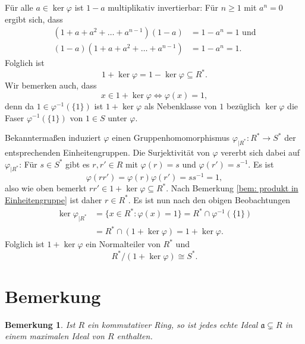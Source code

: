 \documentclass[a4paper,10pt]{article}
\newcounter{satze}
\newtheorem{bem}[satze]{Bemerkung}
\newcommand{\mf}[1]{\mathfrak{#1}}
\begin{document}
Für alle $a \in \ker \varphi$ ist $1-a$ multiplikativ invertierbar: Für $n \geq 1$ mit $a^n = 0$ ergibt sich, dass
\begin{align*}
 (1+a+a^2+\ldots+a^{n-1})(1-a) &= 1-a^n = 1 \text{ und} \\
 (1-a)(1+a+a^2+\ldots+a^{n-1}) &= 1-a^n = 1.
\end{align*}
Folglich ist
\[
 1 + \ker \varphi = 1 - \ker \varphi \subseteq R^*.
\]
Wir bemerken auch, dass
\[
 x \in 1 + \ker \varphi \Leftrightarrow \varphi(x) = 1,
\]
denn da $1 \in \varphi^{-1}(\{1\})$ ist $1 + \ker \varphi$ als Nebenklasse von $1$ bezüglich $\ker \varphi$ die Faser $\varphi^{-1}(\{1\})$ von $1 \in S$ unter $\varphi$.

Bekanntermaßen induziert $\varphi$ einen Gruppenhomomorphismus $\varphi_{|R^*} : R^* \rightarrow S^*$ der entsprechenden Einheitengruppen. Die Surjektivität von $\varphi$ vererbt sich dabei auf $\varphi_{|R^*}$: Für $s\in S^*$ gibt es $r,r' \in R$ mit $\varphi(r) = s$ und $\varphi(r') = s^{-1}$. Es ist
\[
 \varphi(r r') = \varphi(r) \varphi(r') = s s^{-1} = 1,
\]
also wie oben bemerkt $r r' \in 1 + \ker \varphi \subseteq R^*$. Nach Bemerkung \ref{bem: produkt in Einheitengruppe} ist daher $r \in R^*$. Es ist nun nach den obigen Beobachtungen
\begin{align*}
 \ker \varphi_{|R^*}
 &= \{x \in R^* : \varphi(x) = 1\}
 = R^* \cap \varphi^{-1}(\{1\}) \\
 &= R^* \cap (1+ \ker \varphi)
 = 1 + \ker \varphi.
\end{align*}
Folglich ist $1 + \ker \varphi$ ein Normalteiler von $R^*$ und
\[
 R^* / (1+ \ker \varphi) \cong S^*.
\]





\section*{Bemerkung}

\begin{bem} \label{bem: alle in max}
 Ist $R$ ein kommutativer Ring, so ist jedes echte Ideal $\mf{a} \subsetneq R$ in einem maximalen Ideal von $R$ enthalten.
\end{bem}
\end{document}
